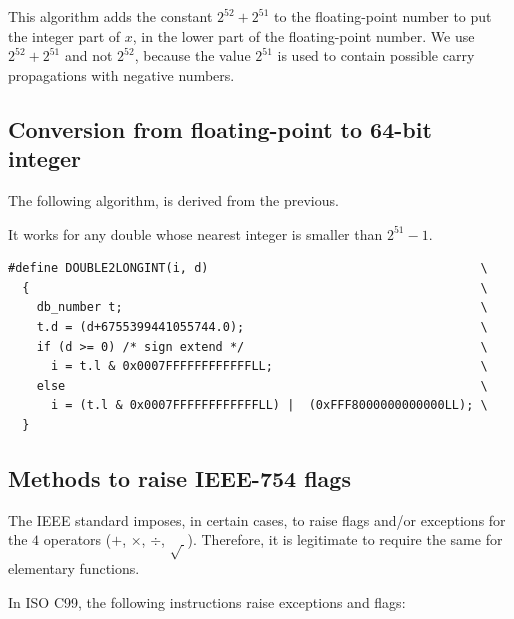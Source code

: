 This algorithm adds the constant $2^{52}+2^{51}$ to the floating-point
number to put the integer part of $x$, in the lower part of the
floating-point number.  We use $2^{52}+2^{51}$ and not $2^{52}$,
because the value $2^{51}$ is used to contain possible carry
propagations with negative numbers.


\subsection{Conversion from floating-point to 64-bit integer \label{sec:double2longint}}

\begin{theorem}
  The following algorithm, is derived from the previous.

  It works for any double whose nearest integer is smaller than $2^{51} -1$.

\begin{lstlisting}[label={chap0:lst:conversion3},caption={Conversion from FP to long long int},firstnumber=1]
#define DOUBLE2LONGINT(i, d)                                      \
  {                                                               \
    db_number t;                                                  \
    t.d = (d+6755399441055744.0);                                 \
    if (d >= 0) /* sign extend */                                 \
      i = t.l & 0x0007FFFFFFFFFFFFLL;                             \
    else                                                          \
      i = (t.l & 0x0007FFFFFFFFFFFFLL) |  (0xFFF8000000000000LL); \
  }
\end{lstlisting}

\end{theorem}




\subsection{Methods to raise IEEE-754 flags}

The IEEE standard imposes, in certain cases, to raise flags and/or
exceptions for the $4$ operators ($+$, $\times$, $\div$, $\sqrt{~}$).
Therefore, it is legitimate to require the same for elementary
functions.

In ISO C99, the following instructions raise exceptions and
flags:

